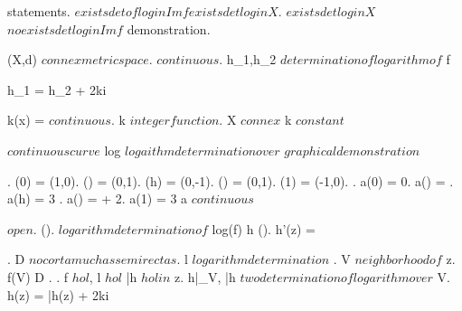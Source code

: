 \documentclass[../Main/main]{subfiles}
\begin{document}
{	
	{
		{
			statements.
		}
		\holds
		{
			$exists det of log in Im f $\imp $ exists det log in X $.
			$exists det log in X $\suchthat $no exists det log in Im f$
		}
		\demonstration
		{
			demonstration.
		}
	}
	
	
	{
		{
			(X,d) $ connex metric space $.
			 $ continuous $.
			h_1,h_2 $ determination of logarithm of $ f
		}
		\holds
		{
			{
				h_1 = h_2 + 2k\pi i
			}
			
		}
		\demonstration
		{
			{
				k(x) =  $ continuous $.
				k $integer function $.
				X $connex $ \imp k $ constant $
			}
		}
	}
	
	
	{
		{
			\function{ \gamma }{ [a,b] }{ \C \nonzero } $ continuous curve $
		}
		\holds
		{
			{
				log $ logaithm determination over $ \gamma*
			}
		}
		\demonstration
		{
			$graphical demonstration $
		}
	}
	
	
	{
		{
			\function{ \gamma }{ [0,1] }{ \C }.
			\gamma(0) = (1,0).
			\gamma() = (0,1).
			\gamma(h) = (0,-1).
			\gamma() = (0,1).
			\gamma(1) = (-1,0).
			.
			a(0) = 0.
			a() = .
			a(h) = 3 .
			a() =  + 2\pi.
			a(1) = 3\pi
		}
		{
			a $ continuous $
		}
	}
	
	
	{
		{
			\Uc \subset \C $ open $.
			 \in \Hc(\Uc).
			 $ logarithm determination of $ log(f)
		}
		\holds
		{
			h \in \Hc(\Uc).
			h'(z) = 
		}
		\demonstration
		{
			{
				.
				D $ no corta muchas semirectas $.
				{
					l $ logarithm determination $
				}.
				{
					V $ neighborhood of $ z.
					f(V) \subset D
				}.
				.
				f $ hol $, l $ hol $ \imp \bar{h} $ hol in $ z.
				h|_V, \bar{h} $ two determination of logarithm over $ V.
				 {
				 	h(z) = \bar{h}(z) + 2k\pi i
				 } 

}}}}
\end{document}
